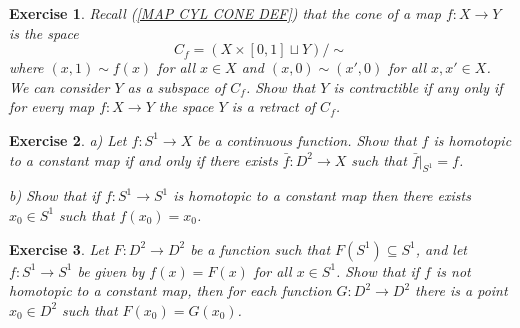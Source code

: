 \documentclass[11pt, letterpaper, oneside]{report}
\theoremstyle{pplain}
\theoremstyle{ddefinition}
\theoremstyle{nnn}
\theoremstyle{eexercise}
\newtheorem{exercise}{Exercise}[chapter]
\begin{document}
\begin{exercise}
Recall (\ref{MAP CYL CONE DEF}) that the cone of a map $f\colon X \to Y$  is the space  
$$C_{f} =  (X\times [0, 1] \sqcup Y)/{\sim}$$
where $(x, 1) \sim f(x)$ for all $x\in X$ and $(x,0)\sim (x', 0)$ for all $x, x'\in X$. We 
can consider $Y$ as a subspace of $C_{f}$. Show that  $Y$ is contractible if any only 
if for every map $f\colon X \to Y$ the space $Y$ is a retract of $C_{f}$. 
\end{exercise}




\begin{exercise}
\label{S1 TO D2 EXT EXERCISE}
a) Let $f\colon S^{1} \to X$ be a continuous function. Show that $f$ is homotopic to a constant map 
if and only if there exists $\bar{f}\colon D^{2} \to X$ such that $\bar{f}|_{S^{1}} = f$. 

b) Show that if $f\colon S^{1} \to S^{1}$ is homotopic to a constant map then there exists $x_{0}\in S^{1}$
such that $f(x_{0}) = x_{0}$. 
\end{exercise}







\begin{exercise}
Let $F\colon D^{2} \to D^{2}$ be a function such that $F(S^{1}) \subseteq S^{1}$, and let  $f\colon S^{1}\to S^{1}$ 
be given by $f(x) = F(x)$  for all $x\in S^{1}$. Show that if $f$ is not homotopic to a constant map, then for each function $G\colon D^{2} \to D^{2}$ there is a point $x_{0}\in D^{2}$ such that $F(x_{0}) = G(x_{0})$.
\end{exercise}
\end{document}
